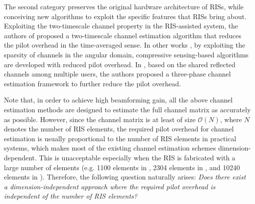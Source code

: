 \documentclass[journal,twocolumn]{IEEEtran}
\theoremstyle{nonumberplain}
\begin{document}
The second category preserves the original hardware architecture of RISs, while conceiving new algorithms to exploit the specific features that RISs bring about.
Exploiting the two-timescale channel property in the RIS-assisted system, the authors of \cite{Huchen} proposed a two-timescale channel estimation algorithm that reduces the pilot overhead in the time-averaged sense.
In other works \cite{wang2020compressed,wei2021channel}, by exploiting the sparsity of channels in the angular domain, compressive sensing-based algorithms are developed with reduced pilot overhead.
In \cite{wang2020channel}, based on the shared reflected channels among multiple users, the authors proposed a three-phase channel estimation framework to further reduce the pilot overhead. 

Note that, in order to achieve high beamforming gain, all the above channel estimation methods are designed to estimate the full channel matrix as accurately as possible. However, since the channel matrix is at least of size $\mathcal{O}(N)$, where $N$ denotes the number of RIS elements, the required pilot overhead for channel estimation is usually proportional to the number of RIS elements \cite{taha2021enabling,alexandropoulos2020hardware,vlachos2019wideband,nguyen2021hybrid,Huchen,wang2020compressed,wang2020channel,kundu2021channel} in practical systems, which makes most of the existing channel estimation schemes dimension-dependent. This is unacceptable especially when the RIS is fabricated with a large number of elements (e.g. 1100 elements in \cite{pei2021ris}, 2304 elements in \cite{yangfan2020coding}, and 10240 elements in \cite{yang2018reconfigurable}).   %
Therefore, the following question naturally arises: {\it Does there exist a dimension-independent approach where the required pilot overhead is independent of the number of RIS elements?}

\end{document}
